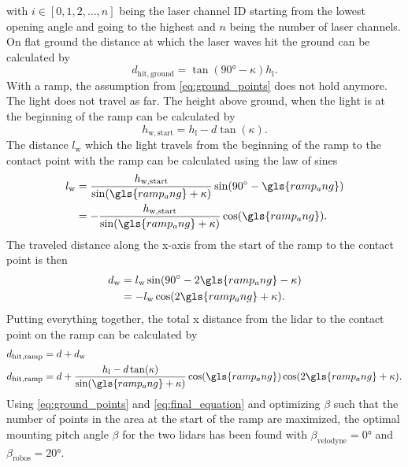 with $i \in [0,1,2,\dots,n]$ being the laser channel ID starting from the lowest opening angle and going to the highest and $n$ being the number of laser channels.
On flat ground the distance at which the laser waves hit the ground can be calculated by
\begin{equation}
    d_\mathrm{hit,ground}  = \tan(\ang{90} - \kappa) h_\mathrm{l}.
    \label{eq:ground_points}
\end{equation}
With a ramp, the assumption from \cref{eq:ground_points} does not hold anymore.
The light does not travel as far.
The height above ground, when the light is at the beginning of the ramp can be calculated by
\begin{equation}
    h_\mathrm{w,start} = h_\mathrm{l} - d\tan(\kappa).
\end{equation}
The distance $l_\mathrm{w}$ which the light travels from the beginning of the ramp to the contact point with the ramp can be calculated using the law of sines
\begin{align}
    l_\mathrm{w} & = \frac{h_\mathrm{w,start} }{\sin(\gls{ramp_ang} + \kappa)} \sin(\ang{90} - \gls{ramp_ang}) \nonumber \\
                 & = -\frac{h_\mathrm{w,start} }{\sin(\gls{ramp_ang} + \kappa)} \cos(\gls{ramp_ang}).
\end{align}
The traveled distance along the x-axis from the start of the ramp to the contact point is then
\begin{align}
    d_\mathrm{w} & = l_\mathrm{w} \sin(\ang{90} - 2\gls{ramp_ang} - \kappa) \nonumber \\
                 & = -l_\mathrm{w} \cos(2\gls{ramp_ang} + \kappa).
\end{align}
Putting everything together, the total x distance from the \gls{lidar} to the contact point on the ramp can be calculated by
\begin{align}
    d_\mathrm{hit,ramp} & = d + d_\mathrm{w}                                                                                    \nonumber               \\
    d_\mathrm{hit,ramp} & = d + \frac{h_\mathrm{l} - d\tan(\kappa)}{\sin(\gls{ramp_ang} + \kappa)} \cos(\gls{ramp_ang}) \cos(2\gls{ramp_ang} + \kappa).
    \label{eq:final_equation}
\end{align}
Using \cref{eq:ground_points} and \cref{eq:final_equation} and optimizing $\beta$ such that the number of points in the area at the start of the ramp are maximized, the optimal mounting pitch angle $\beta$ for the two \glspl{lidar} has been found with $\beta_\mathrm{velodyne} = \ang{0}$ and $\beta_\mathrm{robos} = \ang{20}$.
